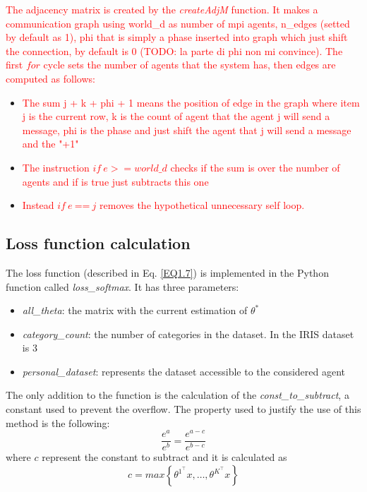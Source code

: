 \documentclass[a4paper,11pt,oneside]{book}
\begin{document}
\textcolor{red}{
The adjacency matrix is created by the \textit{createAdjM} function. It makes a communication graph using world\_d as number of
mpi agents, n\_edges  (setted by default as 1), phi that is simply a phase inserted into
graph which just shift the connection, by default is 0 (TODO: la parte di phi non mi convince). The first $for$
cycle sets the number of agents that the system has, then edges are
computed as follows:}
\begin{itemize}
    \item \textcolor{red}{The sum j + k + phi + 1 means the position of edge in the
    	graph where item j is the current row, k is the count of agent 
    	that the agent j will send a message, phi is the phase and just
    	shift the agent that j will send a message and the "+1" }

    \item \textcolor{red}{The instruction $ if \ e >= world\_d $  checks if the sum is over the number of
    agents and if is true just subtracts this one}

    \item \textcolor{red}{Instead $ if \ e \ $==$ \  j $ removes the hypothetical unnecessary self loop.}
\end{itemize}

\subsection{Loss function calculation}
The loss function (described in Eq. \ref{EQ1.7}) is implemented in the Python function called \textit{loss\_softmax}. It has three parameters:\\
\begin{itemize}
	\item \textit{all\_theta}: the matrix with the current estimation of $\theta^*$
	\item \textit{category\_count}: the number of categories in the dataset. In the IRIS dataset is $3$
	\item \textit{personal\_dataset}: represents the dataset accessible to the considered agent
\end{itemize}
The only addition to the function is the calculation of the \textit{const\_to\_subtract}, a constant used to prevent the overflow. The property used to justify the use of this method is the following:
\begin{equation}
	\dfrac{e^a}{e^b} = \dfrac{e^{a-c}}{e^{b-c}}
\end{equation}
where $c$ represent the constant to subtract and it is calculated as
\begin{equation}
	c = max \left\{ \theta^{1^\top}x, \dots,  \theta^{K^\top}x \right\}
\end{equation}
\end{document}
